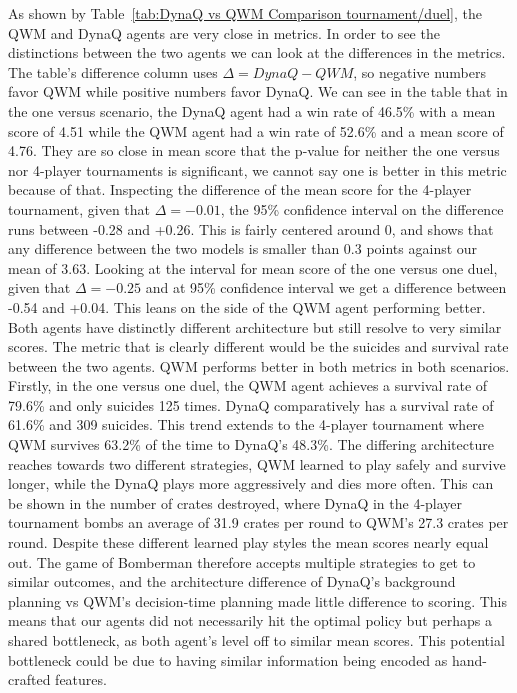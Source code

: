 \documentclass[article, 10pt]{IEEEtran}
\begin{document}
As shown by Table~\ref{tab:DynaQ vs QWM Comparison tournament/duel}, the QWM and DynaQ agents are very close in metrics. In order to see the distinctions between the two agents we can look at the differences in the metrics. The table's difference column uses $\Delta = DynaQ - QWM$, so negative numbers favor QWM while positive numbers favor DynaQ. We can see in the table that in the one versus scenario, the DynaQ agent had a win rate of 46.5\% with a mean score of 4.51 while the QWM agent had a win rate of 52.6\% and a mean score of 4.76. They are so close in mean score that the p-value for neither the one versus nor 4-player tournaments is significant, we cannot say one is better in this metric because of that. Inspecting the difference of the mean score for the 4-player tournament, given that $\Delta = -0.01$, the 95\% confidence interval on the difference runs between -0.28 and +0.26. This is fairly centered around 0, and shows that any difference between the two models is smaller than 0.3 points against our mean of 3.63. Looking at the interval for mean score of the one versus one duel, given that $\Delta = -0.25$ and at 95\% confidence interval we get a difference between -0.54 and +0.04. This leans on the side of the QWM agent performing better. Both agents have distinctly different architecture but still resolve to very similar scores. The metric that is clearly different would be the suicides and survival rate between the two agents. QWM performs better in both metrics in both scenarios. Firstly, in the one versus one duel, the QWM agent achieves a survival rate of 79.6\% and only suicides 125 times. DynaQ comparatively has a survival rate of 61.6\% and 309 suicides. This trend extends to the 4-player tournament where QWM survives 63.2\% of the time to DynaQ's 48.3\%. The differing architecture reaches towards two different strategies, QWM learned to play safely and survive longer, while the DynaQ plays more aggressively and dies more often. This can be shown in the number of crates destroyed, where DynaQ in the 4-player tournament bombs an average of 31.9 crates per round to QWM's 27.3 crates per round. Despite these different learned play styles the mean scores nearly equal out. The game of Bomberman therefore accepts multiple strategies to get to similar outcomes, and the architecture difference of DynaQ's background planning vs QWM's decision-time planning made little difference to scoring. This means that our agents did not necessarily hit the optimal policy but perhaps a shared bottleneck, as both agent's level off to similar mean scores. This potential bottleneck could be due to having similar information being encoded as hand-crafted features.
\end{document}
